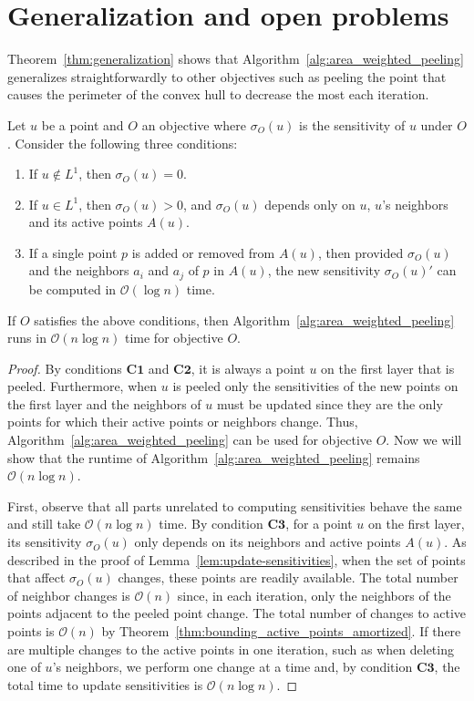 \documentclass{cccg24}
\newcommand{\Oh}[1]{\mathcal{O}\!\lrParents{#1}}
\newcommand{\lrParents}[1]{\left( #1 \right)}
\newcommand{\logn}{\log{n}}
\newcommand{\sensO}[1]{\sigma_O\!\lrParents{#1}}
\begin{document}
\section{Generalization and open problems}
Theorem~\ref{thm:generalization} shows that Algorithm~\ref{alg:area_weighted_peeling} generalizes straightforwardly to other objectives such as peeling the point that causes the perimeter of the convex hull to decrease the most each iteration.

\begin{theorem}\label{thm:generalization}
    Let $u$ be a point and $O$ an objective where $\sensO{u}$ is the sensitivity of $u$ under $O$. Consider the following three conditions:
    \begin{enumerate}
        \item[\textbf{C1:}] If $u \notin L^1$, then $\sensO{u} = 0$.
        \item[\textbf{C2:}] If $u \in L^1$, then $\sensO{u} > 0$, and $\sensO{u}$ depends only on $u$, $u$'s neighbors and its active points $A(u)$.
        \item[\textbf{C3:}] 
        If a single point $p$ is added or removed from $A(u)$, then provided $\sensO{u}$ and the neighbors $a_i$ and $a_{j}$ of $p$ in $A(u)$, the new sensitivity $\sensO{u}'$ can be computed in $\Oh{\logn}$ time.
    \end{enumerate}
    If $O$ satisfies the above conditions, then Algorithm~\ref{alg:area_weighted_peeling} runs in $\Oh{n\logn}$ time for objective $O$. 
\end{theorem}

\begin{proof}%
By conditions $\textbf{C1}$ and $\textbf{C2}$, it is always a point $u$ on the first layer that is peeled. 
Furthermore, when $u$ is peeled only the sensitivities of the new points on the first layer and the neighbors of $u$ must be updated since they are the only points for which their active points or neighbors change. Thus, Algorithm~\ref{alg:area_weighted_peeling} can be used for objective $O$. Now we will show that the runtime of Algorithm~\ref{alg:area_weighted_peeling} remains $\Oh{n\logn}$.

First, observe that all parts unrelated to computing sensitivities behave the same and still take $\Oh{n\logn}$ time. By condition $\textbf{C3}$, for a point $u$ on the first layer, its sensitivity $\sensO{u}$ only depends on its neighbors and active points $A(u)$. As described in the proof of Lemma~\ref{lem:update-sensitivities}, when the set of points that affect $\sensO{u}$ changes, these points are readily available. The total number of neighbor changes is $\Oh{n}$ since, in each iteration, only the neighbors of the points adjacent to the peeled point change. 
The total number of changes to active points is $\Oh{n}$ by Theorem~\ref{thm:bounding_active_points_amortized}. If there are multiple changes to the active points in one iteration, such as when deleting one of $u$'s neighbors, we perform one change at a time and, by condition $\textbf{C3}$, the total time to update sensitivities is $\Oh{n\logn}$. 
\end{proof}
\end{document}
